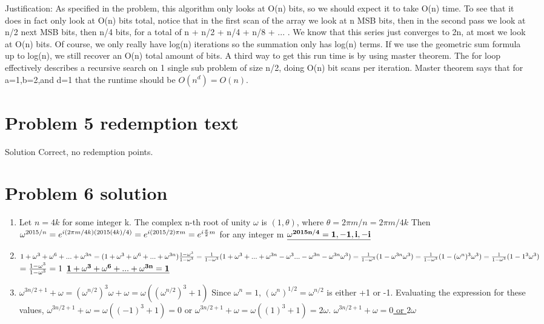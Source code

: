 \documentclass[11pt]{article}
\newenvironment{qparts}{\begin{enumerate}[{(}a{)}]}{\end{enumerate}}
\begin{document}
Justification:\newline
As specified in the problem, this algorithm only looks at O(n) bits, so we should expect it to take O(n) time. To see that it does in fact only look at O(n) bits total, notice that in the first scan of the array we look at n MSB bits, then in the second pass we look at n/2 next MSB bits, then n/4 bits, for a total of n + n/2 + n/4 + n/8 + ... . We know that this series just converges to 2n, at most we look at O(n) bits. Of course, we only really have log(n) iterations so the summation only has log(n) terms. If we use the geometric sum formula up to log(n), we still recover an O(n) total amount of bits. A third way to get this run time is by using master theorem. The for loop effectively describes a recursive search on 1 single sub problem of size n/2, doing O(n) bit scans per iteration. Master theorem says that for a=1,b=2,and d=1 that the runtime should be $O(n^d)= O(n)$.
\newline

\newpage
\section*{Problem 5 redemption text}
Solution Correct, no redemption points.

\newpage
\section*{Problem 6 solution}
\begin{qparts}
\item
Let $n = 4k$ for some integer k. The complex n-th root of unity $\omega$ is $(1, \theta)$, where $\theta = 2\pi m / n = 2\pi m / {4k}$ Then $\omega^{2015/n} = e^{i(2\pi m/4k)(2015(4k)/4)} = e^{i(2015/2)\pi m} = e^{i {\pi \over 2} m}$ for any integer m\newline
$\bf{\underline{\omega^{2015n/4} =  1, -1, i, -i}}$


\item
$1 + \omega^3 + \omega^6 + ... + \omega^{3n} = (1 + \omega^3 + \omega^6 + ... + \omega^{3n}){{1-\omega^3}\over{1-\omega^3}} = {1\over{1-\omega^3}}(1+\omega^3+...+\omega^{3n}-\omega^3 ... -\omega^{3n} - \omega^{3n}\omega^3) = {1\over{1-\omega^3}}(1-\omega^{3n}\omega^3) = {1\over{1-\omega^3}}(1 - (\omega^n)^3 \omega^3) = {1\over{1-\omega^3}} (1-1^3 \omega^3)$\newline
$ = {{1-\omega^3} \over {1-\omega^3}} = 1$\newline
$\underline{\bf{1 + \omega^3 + \omega^6 + ... + \omega^{3n} = 1}}$


\item
$\omega^{3n/2 + 1} + \omega  = (\omega ^{n/2})^3 \omega + \omega = \omega((\omega ^{n/2})^3 + 1)$\newline
Since $\omega^n = 1$, $(\omega^n)^{1/2}=\omega^{n/2}$ is either +1 or -1. Evaluating the expression for these values, $\omega^{3n/2 + 1} + \omega = \omega((-1)^3 + 1) = 0$ or $\omega^{3n/2 + 1} + \omega = \omega((1)^3 + 1) = 2\omega$.\newline
\underline{
$\omega^{3n/2 + 1} + \omega = 0$ or $2\omega$
}
\end{qparts}
\end{document}
